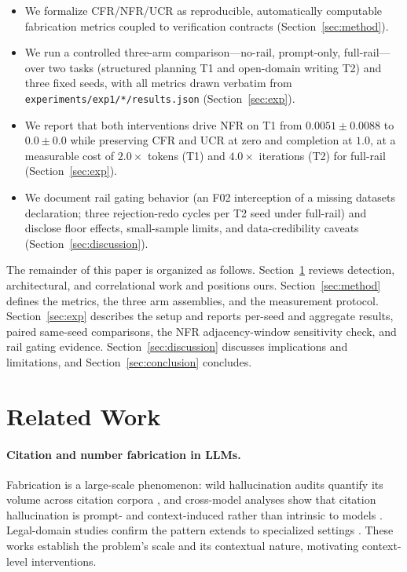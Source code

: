 \documentclass[10pt,twocolumn]{article}
\begin{document}
\begin{itemize}
\item We formalize CFR/NFR/UCR as reproducible, automatically computable fabrication metrics coupled to verification contracts (Section~\ref{sec:method}).
\item We run a controlled three-arm comparison---no-rail, prompt-only, full-rail---over two tasks (structured planning T1 and open-domain writing T2) and three fixed seeds, with all metrics drawn verbatim from \texttt{experiments/exp1/*/results.json} (Section~\ref{sec:exp}).
\item We report that both interventions drive NFR on T1 from $0.0051 \pm 0.0088$ to $0.0 \pm 0.0$ while preserving CFR and UCR at zero and completion at $1.0$, at a measurable cost of $2.0\times$ tokens (T1) and $4.0\times$ iterations (T2) for full-rail (Section~\ref{sec:exp}).
\item We document rail gating behavior (an F02 interception of a missing datasets declaration; three rejection-redo cycles per T2 seed under full-rail) and disclose floor effects, small-sample limits, and data-credibility caveats (Section~\ref{sec:discussion}).
\end{itemize}

The remainder of this paper is organized as follows. Section~\ref{sec:related} reviews detection, architectural, and correlational work and positions ours. Section~\ref{sec:method} defines the metrics, the three arm assemblies, and the measurement protocol. Section~\ref{sec:exp} describes the setup and reports per-seed and aggregate results, paired same-seed comparisons, the NFR adjacency-window sensitivity check, and rail gating evidence. Section~\ref{sec:discussion} discusses implications and limitations, and Section~\ref{sec:conclusion} concludes.

\section{Related Work}
\label{sec:related}

\paragraph{Citation and number fabrication in LLMs.}
Fabrication is a large-scale phenomenon: wild hallucination audits quantify its volume across citation corpora \citep{zhao2026wildhallucinations}, and cross-model analyses show that citation hallucination is prompt- and context-induced rather than intrinsic to models \citep{naser2026howllmscite}. Legal-domain studies confirm the pattern extends to specialized settings \citep{alrajeh2026legalcitations}. These works establish the problem's scale and its contextual nature, motivating context-level interventions.
\end{document}
